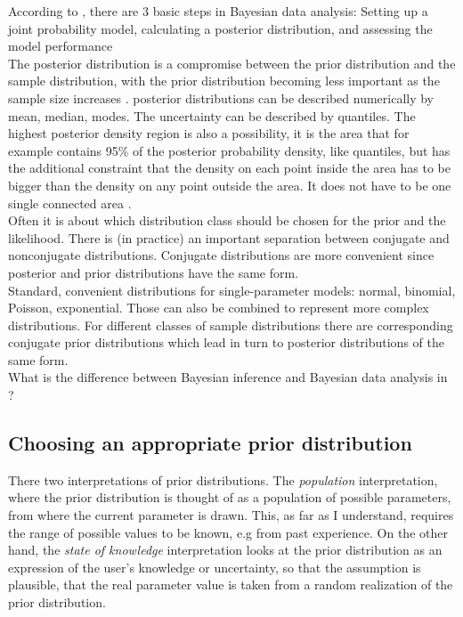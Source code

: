 \documentclass{article}
\begin{document}
According to \cite{1439840954}, there are 3 basic steps in Bayesian data analysis: Setting up a joint probability model, calculating a posterior distribution, and assessing the model performance
\\
The posterior distribution is a compromise between the prior distribution and the sample distribution, with the prior distribution becoming less important as the sample size increases \cite{1439840954}.
posterior distributions can be described numerically by mean, median, modes. The uncertainty can be described by quantiles. The highest posterior density region is also a possibility, it is the area that for example contains 95\% of the posterior probability density, like quantiles, but has the additional constraint that the density on each point inside the area has to be bigger than the density on any point outside the area. It does not have to be one single connected area  \cite{1439840954}.
\\
Often it is about which distribution class should be chosen for the prior and the likelihood. There is (in practice) an important separation between conjugate and nonconjugate distributions. Conjugate distributions are more convenient since posterior and prior distributions have the same form.
\\
Standard, convenient distributions for single-parameter models: normal, binomial, Poisson, exponential. Those can also be combined to represent more complex distributions. For different classes of sample distributions there are corresponding conjugate prior distributions which lead in turn to posterior distributions of the same form. \cite{1439840954}
\\
What is the difference between Bayesian inference and Bayesian data analysis in \cite{1439840954}?


\subsection{Choosing an appropriate prior distribution}
There two interpretations of prior distributions. The \textit{population} interpretation, where the prior distribution is thought of as a population of possible parameters, from where the current parameter is drawn. This, as far as I understand, requires the range of possible values to be known, e.g from past experience. On the other hand, the \textit{state of knowledge} interpretation looks at the prior distribution as an expression of the user's knowledge or uncertainty, so that the assumption is plausible, that the real parameter value is taken from a random realization of the prior distribution.
\end{document}
